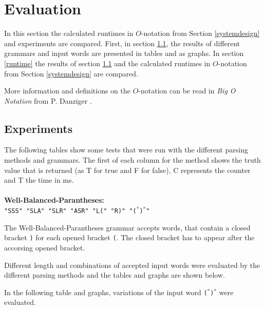 \documentclass[a4paper, 11pt]{article}
\begin{document}

\pagebreak













\section{Evaluation}
\label{evaluation}

In this section the calculated runtimes in $O$-notation from Section \ref{systemdesign} and experiments are compared. 
First, in section \ref{experiments}, the results of different grammars and input words are presented in tables and as graphs.
In section \ref{runtime} the results of section \ref{experiments} and the calculated runtimes in $O$-notation from Section \ref{systemdesign} are compared.

More information and definitions on the $O$-notation can be read in \textit{Big O Notation} from P. Danziger \cite{bigO}.


\subsection{Experiments}
\label{experiments}

The following tables show some tests that were run with the different parsing methods and grammars. The first of each column for the method shows the truth value that is returned (as T for true and F for false), C represents the counter and T the time in ms.
\\
\\
\textbf{Well-Balanced-Parantheses:} \\
\texttt{"SSS" "SLA" "SLR" "ASR" "L(" "R)" "($^*$)$^*$"}

The Well-Balanced-Parantheses grammar accepts words, that contain a closed bracket \texttt{)} for each opened bracket \texttt{(}. The closed bracket has to appear after the accorsing opened bracket.

Different length and combinations of accepted input words were evaluated by the different parsing methods and the tables and graphs are shown below.

In the following table and graphs, variations of the input word \texttt{($^*$)$^*$} were evaluated.
\end{document}
